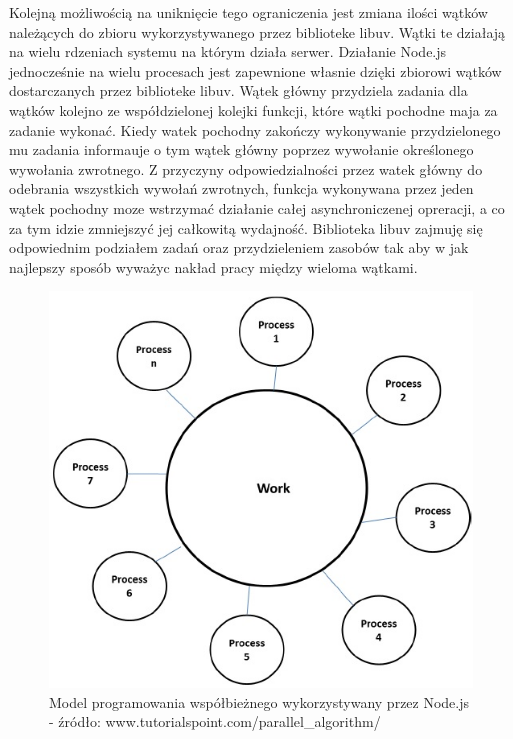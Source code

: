 \documentclass[12pt]{report}
\begin{document}
Kolejną możliwością na uniknięcie tego ograniczenia jest zmiana ilości wątków należących do zbioru wykorzystywanego przez biblioteke libuv. 
Wątki te działają na wielu rdzeniach systemu na którym działa serwer. 
Działanie Node.js jednocześnie na wielu procesach jest zapewnione własnie dzięki zbiorowi wątków dostarczanych przez biblioteke libuv.
Wątek główny przydziela zadania dla wątków kolejno ze współdzielonej kolejki funkcji, które wątki pochodne maja za zadanie wykonać. 
Kiedy watek pochodny zakończy wykonywanie przydzielonego mu zadania informauje o tym wątek główny poprzez wywołanie określonego wywołania zwrotnego. 
Z przyczyny odpowiedzialności przez watek główny do odebrania wszystkich wywołań zwrotnych, funkcja wykonywana przez jeden wątek pochodny moze wstrzymać działanie całej asynchroniczenej opreracji, a co za tym idzie zmniejszyć jej całkowitą wydajność. 
Biblioteka libuv zajmuję się odpowiednim podziałem zadań oraz przydzieleniem zasobów tak aby w jak najlepszy sposób wyważyc nakład pracy między wieloma wątkami. 

\begin{figure}[!hb]
\centering
\includegraphics[width=\textwidth,height=\textheight,keepaspectratio]{thread.png} 
\caption{Model programowania współbieżnego wykorzystywany przez Node.js - źródło: www.tutorialspoint.com/parallel\_algorithm/}
\end{figure}
\end{document}
